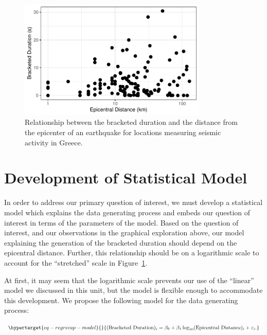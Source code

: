 \documentclass[
  letterpaper,
  DIV=11,
  numbers=noendperiod]{scrreprt}
\theoremstyle{definition}
\theoremstyle{definition}
\theoremstyle{plain}
\theoremstyle{remark}
\begin{document}
\begin{figure}

{\centering \includegraphics[width=0.8\textwidth,height=\textheight]{./images/fig-regrecap-plot-1.pdf}

}

\caption{\label{fig-regrecap-plot}Relationship between the bracketed
duration and the distance from the epicenter of an earthquake for
locations measuring seismic activity in Greece.}

\end{figure}

\hypertarget{development-of-statistical-model}{%
\section{Development of Statistical
Model}\label{development-of-statistical-model}}

In order to address our primary question of interest, we must develop a
statistical model which explains the data generating process and embeds
our question of interest in terms of the parameters of the model. Based
on the question of interest, and our observations in the graphical
exploration above, our model explaining the generation of the bracketed
duration should depend on the epicentral distance. Further, this
relationship should be on a logarithmic scale to account for the
``stretched'' scale in Figure~\ref{fig-regrecap-plot}.

At first, it may seem that the logarithmic scale prevents our use of the
``linear'' model we discussed in this unit, but the model is flexible
enough to accommodate this development. We propose the following model
for the data generating process:

\begin{equation}\protect\hypertarget{eq-regrecap-model}{}{(\text{Bracketed Duration})_i = \beta_0 + \beta_1 \log_{10}(\text{Epicentral Distance})_i + \varepsilon_i.}\label{eq-regrecap-model}\end{equation}
\end{document}
